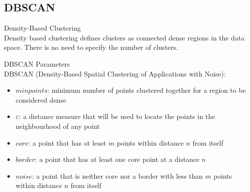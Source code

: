 
\subsection{DBSCAN}

\begin{definition}{Density-Based Clustering}\\
Density based clustering defines clusters as connected dense regions in the data space. There is no need to specify the number of clusters.
\end{definition}

\begin{definition}{DBSCAN Parameters}\\
DBSCAN (Density-Based Spatial Clustering of Applications with Noise):
\begin{itemize}
    \item $minpoints$: minimum number of points clustered together for a region to be considered dense
    \item $\varepsilon$: a distance measure that will be used to locate the points in the neighbourhood of any point
    \item $core$: a point that has at least $m$ points within distance $n$ from itself
    \item $border$: a point that has at least one core point at a distance $n$
    \item $noise$: a point that is neither core nor a border with less than $m$ points within distance $n$ from itself
\end{itemize}
\end{definition}

